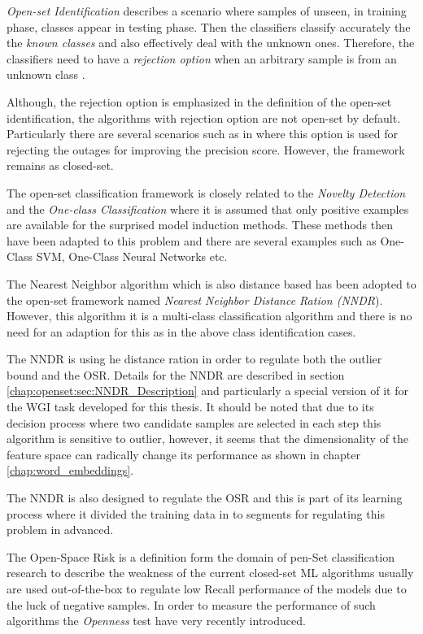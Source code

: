 \begin{definition}{\textit{Open-set Identification}}
describes a scenario where samples of unseen, in training phase, classes appear in testing phase. Then the classifiers classify accurately the the \textit{known classes} and also effectively deal with the unknown ones. Therefore, the classifiers need to have a \textit{rejection option} when an arbitrary sample is from an unknown class \parencite{geng2018recent}.
\end{definition}
    
Although, the rejection option is emphasized in the definition of the open-set identification, the algorithms with rejection option are not open-set by default. Particularly there are several scenarios such as in \parencite{onan2018ensemble} where this option is used for rejecting the outages for improving the precision score. However, the framework remains as closed-set.
    
The open-set classification framework is closely related to the \textit{Novelty Detection} and the \textit{One-class Classification} where it is assumed that only positive examples are available for the surprised model induction methods. These methods then have been adapted to this problem and there are several examples such as One-Class SVM, One-Class Neural Networks etc.

The Nearest Neighbor algorithm which is also distance based has been adopted to the open-set framework named \textit{Nearest Neighbor Distance Ration (NNDR}). However, this algorithm it is a multi-class classification algorithm and there is no need for an adaption for this as in the above class identification cases.

The NNDR is using he distance ration in order to regulate both the outlier bound and the OSR. Details for the NNDR are described in section \ref{chap:openset:sec:NNDR_Description} and particularly a special version of it for the WGI task developed for this thesis. It should be noted that due to its decision process where two candidate samples are selected in each step this algorithm is sensitive to outlier, however, it seems that the dimensionality of the feature space can radically change its performance as shown in chapter \ref{chap:word_embeddings}.

The NNDR is also designed to regulate the OSR and this is part of its learning process where it divided the training data in to segments for regulating this problem in advanced. 

The {Open-Space Risk} is a definition form the domain of pen-Set classification research to describe the weakness of the current closed-set ML algorithms usually are used out-of-the-box to regulate low Recall performance of the models due to the luck of negative samples. In order to measure the performance of such algorithms the \textit{Openness} test have very recently introduced. 

